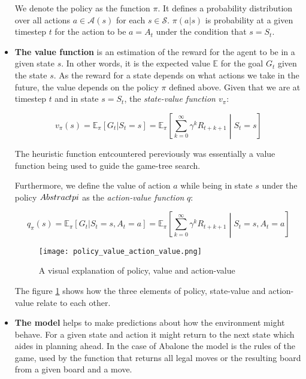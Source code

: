\begin{itemize}
          We denote the policy as the function $\pi $. It defines a probability distribution over all actions $ a \in \mathcal{A}(s)$ for each $ s \in \mathcal{S} $. $ \pi(a|s)$ is probability at a given timestep $t$ for the action to be $ a = A_t $ under the condition that $ s = S_t $.

    \item \textbf{The value function} is an estimation of the reward for the agent to be in a given state $ s $. In other words, it is the expected value $\mathbb{E}$  for the goal $G_t$ given the state $s$.  As the reward for a state depends on what actions we take in the future, the value depends on the policy $ \pi $ defined above. Given that we are at timestep $ t $ and in state $ s = S_t $, the \textit{state-value function $v_{\pi}$}:

          \begin{equation}
              v_{\pi}(s) = \mathbb{E}_{\pi}[G_t | S_t = s] = \mathbb{E}_{\pi}\left[\sum_{k=0}^{\infty} \gamma^kR_{t+k+1} \middle| S_t = s \right]
          \end{equation}

          The heuristic function entcountered pereviously was essentially a value function being used to guide the game-tree search.

          Furthermore, we define the value of action $a$ while being in state $s$ under the policy $\abstractname{}pi$ as the \textit{action-value function} $q$:


          \begin{equation}
              q_{\pi}(s) = \mathbb{E}_{\pi}[G_t | S_t = s, A_t = a] = \mathbb{E}_{\pi}\left[\sum_{k=0}^{\infty} \gamma^kR_{t+k+1} \middle| S_t = s, A_t = a \right]
          \end{equation}

          \begin{figure}
              \centering
              \texttt{[image: policy\_value\_action\_value.png]}
              \caption{A visual explanation of policy, value and action-value \cite[p.62]{sutton_reinforcement_2018}}
              \label{policy_value_action_value}
          \end{figure}

          The figure \ref{policy_value_action_value} shows how the three elements of policy, state-value and action-value relate to each other.

    \item \textbf{The model} helps to make predictions about how the environment might behave. For a given state and action it might return to the next state which aides in planning ahead. In the case of Abalone the model is the rules of the game, used by the function that returns all legal moves or the resulting board from a given board and a move.
\end{itemize}

